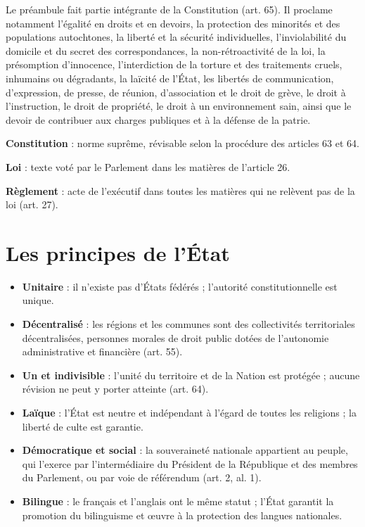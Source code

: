 \documentclass[11pt,a4paper,oneside]{report}
\begin{document}
Le préambule fait partie intégrante de la Constitution (art. 65). Il proclame notamment l'égalité en droits et en devoirs, la protection des minorités et des populations autochtones, la liberté et la sécurité individuelles, l'inviolabilité du domicile et du secret des correspondances, la non-rétroactivité de la loi, la présomption d'innocence, l'interdiction de la torture et des traitements cruels, inhumains ou dégradants, la laïcité de l'État, les libertés de communication, d'expression, de presse, de réunion, d'association et le droit de grève, le droit à l'instruction, le droit de propriété, le droit à un environnement sain, ainsi que le devoir de contribuer aux charges publiques et à la défense de la patrie.

\begin{defbox}[title={Définition — Trois notions à ne pas confondre}]
\textbf{Constitution} : norme suprême, révisable selon la procédure des articles 63 et 64.

\textbf{Loi} : texte voté par le Parlement dans les matières de l'article 26.

\textbf{Règlement} : acte de l'exécutif dans toutes les matières qui ne relèvent pas de la loi (art. 27).
\end{defbox}
\section{Les principes de l'État}
\begin{itemize}
  \item \textbf{Unitaire} : il n'existe pas d'États fédérés ; l'autorité constitutionnelle est unique.
  \item \textbf{Décentralisé} : les régions et les communes sont des collectivités territoriales décentralisées, personnes morales de droit public dotées de l'autonomie administrative et financière (art. 55).
  \item \textbf{Un et indivisible} : l'unité du territoire et de la Nation est protégée ; aucune révision ne peut y porter atteinte (art. 64).
  \item \textbf{Laïque} : l'État est neutre et indépendant à l'égard de toutes les religions ; la liberté de culte est garantie.
  \item \textbf{Démocratique et social} : la souveraineté nationale appartient au peuple, qui l'exerce par l'intermédiaire du Président de la République et des membres du Parlement, ou par voie de référendum (art. 2, al. 1).
  \item \textbf{Bilingue} : le français et l'anglais ont le même statut ; l'État garantit la promotion du bilinguisme et œuvre à la protection des langues nationales.
\end{itemize}
\end{document}
